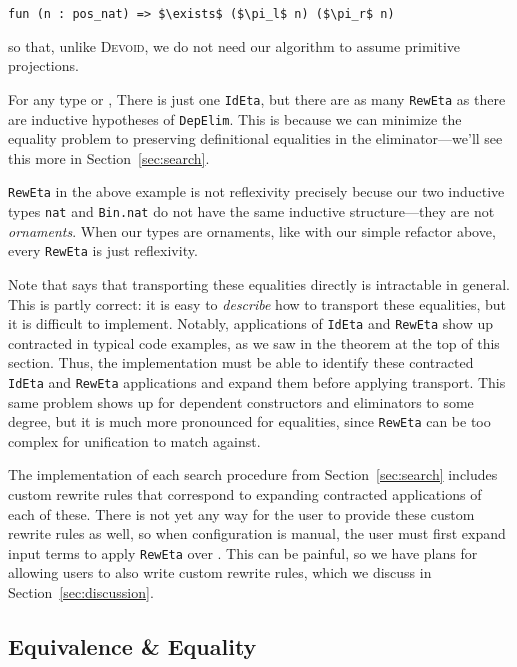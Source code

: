 \begin{lstlisting}
fun (n : pos_nat) => $\exists$ ($\pi_l$ n) ($\pi_r$ n)
\end{lstlisting}
so that, unlike \textsc{Devoid}, we do not need our algorithm to assume primitive projections.

For any type \A or \B,
There is just one \lstinline{IdEta}, but there are as many \lstinline{RewEta} as there are
inductive hypotheses of \lstinline{DepElim}.
This is because we can minimize the equality problem to preserving definitional equalities
in the eliminator---we'll see this more in Section~\ref{sec:search}.

\lstinline{RewEta} in the above example is not reflexivity precisely becuse our two inductive types
\lstinline{nat} and \lstinline{Bin.nat} do not have the same inductive structure---they are not \textit{ornaments}. %
When our types are ornaments, like with our simple refactor above, every \lstinline{RewEta} is just reflexivity.

Note that \citet{tabareau2019marriage} says that transporting these equalities directly
is intractable in general.
This is partly correct: it is easy to \textit{describe} how to transport these equalities,
but it is difficult to implement.
Notably, applications of \lstinline{IdEta} and \lstinline{RewEta} show up contracted in typical code examples,
as we saw in the theorem at the top of this section.
Thus, the implementation must be able to identify these contracted \lstinline{IdEta} and \lstinline{RewEta}
applications and expand them before applying transport.
This same problem shows up for dependent constructors and eliminators to some degree,
but it is much more pronounced for equalities,
since \lstinline{RewEta} can be too complex for unification to match against.

The implementation of each search procedure from Section~\ref{sec:search} includes custom rewrite rules that correspond to expanding
contracted applications of each of these.
There is not yet any way for the user to provide these custom rewrite rules as well,
so when configuration is manual, the user must first expand input terms to apply \lstinline{RewEta} over \A.
This can be painful, so we have plans for allowing users to also write custom rewrite rules,
which we discuss in Section~\ref{sec:discussion}.

\subsection{Equivalence \& Equality}
\label{sec:art}

